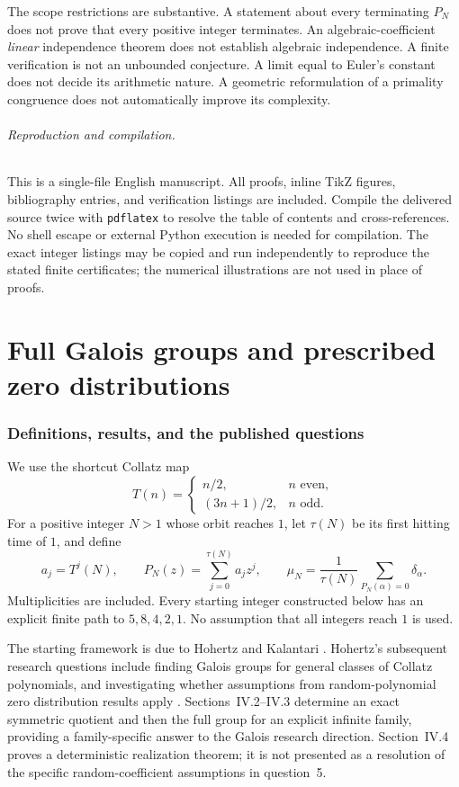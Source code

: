 \documentclass[11pt,a4paper]{article}
\theoremstyle{definition}
\theoremstyle{remark}
\numberwithin{equation}{section}
\begin{document}
The scope restrictions are substantive. A statement about every
terminating $P_N$ does not prove that every positive integer terminates.
An algebraic-coefficient \emph{linear} independence theorem does not
establish algebraic independence. A finite verification is not an
unbounded conjecture. A limit equal to Euler's constant does not decide
its arithmetic nature. A geometric reformulation of a primality
congruence does not automatically improve its complexity.

\paragraph{Reproduction and compilation.}
This is a single-file English manuscript. All proofs, inline TikZ
figures, bibliography entries, and verification listings are included.
Compile the delivered source twice with \texttt{pdflatex} to resolve
the table of contents and cross-references. No shell escape or external
Python execution is needed for compilation. The exact integer listings
may be copied and run independently to reproduce the stated finite
certificates; the numerical illustrations are not used in place of
proofs.

\clearpage
\clearpage
\part{Full Galois groups and prescribed zero distributions}\label{part:D}
\setcounter{section}{0}
\renewcommand{\thesection}{IV.\arabic{section}}
\section{Definitions, results, and the published questions}
We use the shortcut Collatz map
\[
 T(n)=\begin{cases}n/2,&n\text{ even},\\(3n+1)/2,&n\text{ odd}.\end{cases}
\]
For a positive integer $N>1$ whose orbit reaches $1$, let $\tau(N)$ be
its first hitting time of $1$, and define
\[
 a_j=T^j(N),\qquad
 P_N(z)=\sum_{j=0}^{\tau(N)}a_jz^j,\qquad
 \mu_N=\frac1{\tau(N)}\sum_{P_N(\alpha)=0}\delta_\alpha.
\]
Multiplicities are included. Every starting integer constructed below has
an explicit finite path to $5,8,4,2,1$. No assumption that all integers
reach $1$ is used.

The starting framework is due to Hohertz and Kalantari
\cite{R025}. Hohertz's subsequent research questions include finding
Galois groups for general classes of Collatz polynomials, and investigating
whether assumptions from random-polynomial zero distribution results apply
\cite[Section~5, questions~5--6]{R005}. Sections~IV.2--IV.3 determine an exact symmetric quotient and then the full
group for an explicit infinite family, providing a family-specific answer
to the Galois research direction. Section~IV.4 proves a deterministic
realization theorem; it is not presented as a resolution of the specific
random-coefficient assumptions in question~5.
\end{document}
